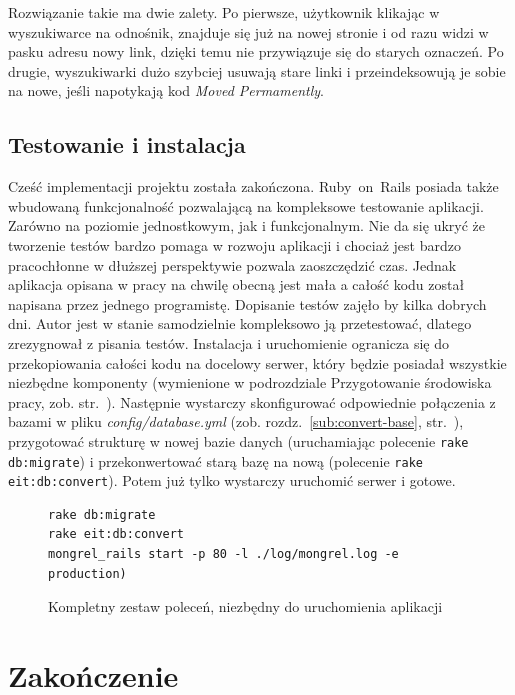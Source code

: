 \documentclass[a4paper,12pt,oneside]{report}
\begin{document}
Rozwiązanie takie ma dwie zalety. Po pierwsze, użytkownik klikając w wyszukiwarce na odnośnik, znajduje się już na nowej stronie i od razu widzi w pasku adresu nowy link, dzięki temu nie przywiązuje się do starych oznaczeń. Po drugie, wyszukiwarki dużo szybciej usuwają stare linki i przeindeksowują je sobie na nowe, jeśli napotykają kod \emph{Moved Permamently}.

\section{Testowanie i instalacja}
\label{sec:testowanie}
Cześć implementacji projektu została zakończona. Ruby~on~Rails posiada także wbudowaną funkcjonalność pozwalającą na kompleksowe testowanie aplikacji. Zarówno na poziomie jednostkowym, jak i funkcjonalnym. Nie da się ukryć że tworzenie testów bardzo pomaga w rozwoju aplikacji i chociaż jest bardzo pracochłonne w dłuższej perspektywie pozwala zaoszczędzić czas. Jednak aplikacja opisana w pracy na chwilę obecną jest mała a całość kodu został napisana przez jednego programistę. Dopisanie testów zajęło by kilka dobrych dni. Autor jest w stanie samodzielnie kompleksowo ją przetestować, dlatego zrezygnował z pisania testów.
Instalacja i uruchomienie ogranicza się do przekopiowania całości kodu na docelowy serwer, który będzie posiadał wszystkie niezbędne komponenty (wymienione w podrozdziale Przygotowanie środowiska pracy, zob. str.~\pageref{sec:srodowisko}). Następnie wystarczy skonfigurować odpowiednie połączenia z bazami w pliku \emph{config/database.yml} (zob. rozdz.~\ref{sub:convert-base}, str.~\pageref{sub:convert-base}), przygotować strukturę w nowej bazie danych (uruchamiając polecenie \verb+rake db:migrate+) i przekonwertować starą bazę na nową (polecenie \verb+rake eit:db:convert+). Potem już tylko wystarczy uruchomić serwer i gotowe.
\begin{figure}[h]
\centering
\begin{verbatim}rake db:migrate
rake eit:db:convert
mongrel_rails start -p 80 -l ./log/mongrel.log -e production)\end{verbatim}
\caption{Kompletny zestaw poleceń, niezbędny do uruchomienia aplikacji\label{fig:runapp}}
\end{figure}

\chapter{Zakończenie}
\label{cha:end}
\end{document}
